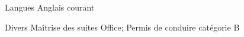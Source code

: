 
\begin{cvskills}

  \cvskill
    {Langues} %
    {Anglais courant} %

  \cvskill
    {Divers} %
    {Maîtrise des suites Office; Permis de conduire catégorie B} %

\end{cvskills}
